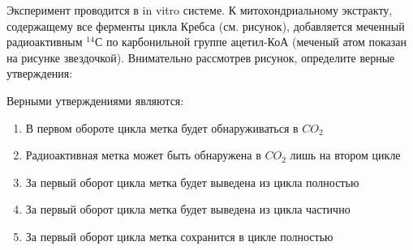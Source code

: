 
Эксперимент проводится в in vitro системе. К митохондриальному
экстракту, содержащему все ферменты цикла Кребса (см. рисунок),  добавляется меченный радиоактивным $^{14}$С
по карбонильной группе ацетил-КоА (меченый атом показан на рисунке
звездочкой). Внимательно рассмотрев рисунок, определите верные утверждения:


Верными утверждениями являются:

\begin{enumerate}
    \item В первом обороте цикла метка будет обнаруживаться в $CO_2$
    \item Радиоактивная метка может быть обнаружена в $CO_2$ лишь на втором цикле
    \item За первый оборот цикла метка будет выведена из цикла полностью
    \item За первый оборот цикла метка будет выведена из цикла частично
    \item За первый оборот цикла метка сохранится в цикле полностью
\end{enumerate}



